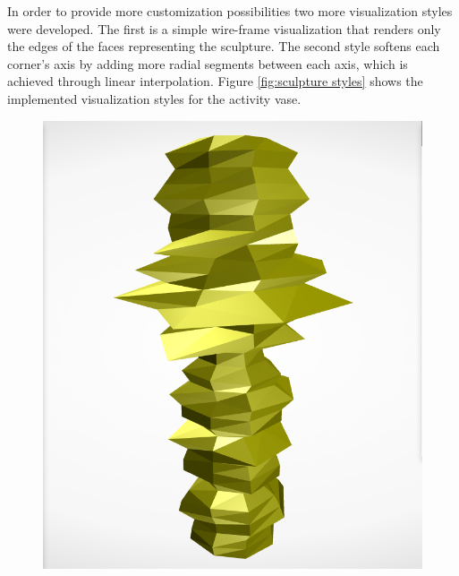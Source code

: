 \documentclass[../medieninformatik-arbeit.tex]{subfiles}
\begin{document}
In order to provide more customization possibilities two more visualization styles were developed. The first is a simple wire-frame visualization that renders only the edges of the faces representing the sculpture. The second style softens each corner's axis by adding more radial segments between each axis, which is achieved through linear interpolation. Figure \ref{fig:sculpture styles} shows the implemented visualization styles for the activity vase. 

\begin{figure}[t!]
\centering
\begin{minipage}{.225\textwidth}
\centering
\includegraphics[width=\linewidth]{Configurator/img/sculpture-1}
\end{minipage}
\begin{minipage}{.225\textwidth}
\centering

\end{minipage}
\end{figure}
\end{document}
